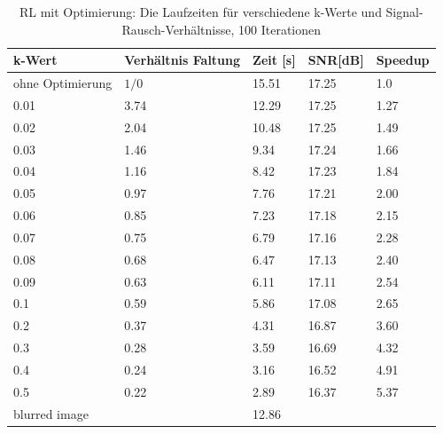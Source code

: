 \documentclass[a4paper,12pt]{article}
\begin{document}
\begin{table}[h]
\begin{center}
\begin{tabular}{ | l | l | l | l | l |}
\hline
k-Wert 				 &	Verhältnis Faltung 	& Zeit [s] & SNR[dB] & Speedup \\ \hline
ohne Optimierung 	 & 		$1/0$				& 	15.51 & 17.25	 & 	1.0 	\\ \hline
0.01				 & 		3.74			&	12.29 & 17.25    &  1.27\\
0.02				 & 		2.04			&	10.48 & 17.25    & 	1.49\\
0.03				 & 		1.46			&	9.34  & 17.24    & 	1.66\\
0.04				 &		1.16			&	8.42  & 17.23    & 	1.84\\
0.05				 & 		0.97			&	7.76  & 17.21    & 	2.00\\
0.06				 & 		0.85			&	7.23  & 17.18    & 	2.15\\ 
0.07				 & 		0.75			&	6.79  & 17.16    & 	2.28\\
0.08				 & 		0.68			&	6.47  & 17.13    & 	2.40\\
0.09				 & 		0.63			&	6.11  & 17.11    & 	2.54\\
0.1					 & 		0.59			&	5.86  & 17.08    & 	2.65\\
0.2					 &		0.37			&	4.31  & 16.87    & 	3.60\\
0.3					 &		0.28			&	3.59  & 16.69    & 	4.32\\
0.4					 & 		0.24			& 	  3.16  & 16.52    & 	4.91\\
0.5					 & 		0.22			&	2.89  & 16.37    & 	5.37\\ \hline
                     
blurred image	&		  & 12.86 & \\
\hline
\end{tabular}
\caption{RL mit Optimierung: Die Laufzeiten für verschiedene k-Werte und
Signal-Rausch-Verhältnisse, 100 Iterationen}
\label{tab:konv_time_SNR_RL}
\end{center}
\end{table}
\end{document}
